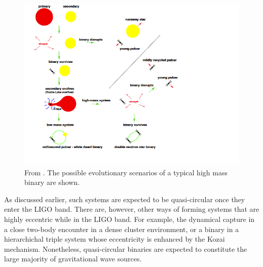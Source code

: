 \begin{figure}[!ht]
\includegraphics[scale=0.95]{intro/BinaryEvolution.png}
\caption[Evolutionary scenarios of a typical high-mass binary.]{From \cite{Lorimer2008}. The possible evolutionary scenarios of a typical high mass binary are shown.}
\label{fig_BinaryEvolution}
\end{figure}

As discussed earlier, such systems are expected to be quasi-circular once they enter the LIGO band. There are, however, other ways of forming systems that are highly eccentric while in the LIGO band. For example, the dynamical capture in a close two-body encounter in a dense cluster environment, or a binary in a hierarchichal triple system whose eccentricity is enhanced by the Kozai mechanism. Nonetheless, quasi-circular binaries are expected to constitute the large majority of gravitational wave sources.


